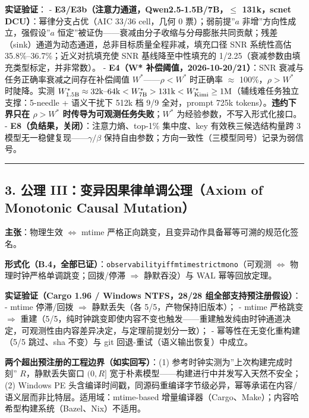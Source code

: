 \documentclass[
]{ctexart}
\renewcommand{\_}{\discretionary{}{}{\textunderscore}}
\renewcommand{\text}[1]{\textnormal{#1}}
\begin{document}
\textbf{实证验证}： -
\textbf{E3/E3b（注意力通道，Qwen2.5-1.5B/7B，\(\le\) 131k，scnet
DCU）}：幂律分支占优（AIC 33/36 cell，几何 0 票）；弱前提''\(a\)
非增''方向性成立，强假设''\(a\)
恒定''被证伪------衰减由分子收缩与分母膨胀共同贡献；残差（sink）通道为动态通道，总非目标质量全程非减，填充口径
SNR 系统性高估 35.8\%--36.7\%；近义对抗填充使 SNR 基线降至中性填充的
1/2.25（衰减参数由填充类型标定，并非常数）。 - \textbf{E4（W*
补偿阈值，2026-10-20/21）}：SNR 衰减与任务正确率衰减之间存在补偿阈值
\(W^*\)------\(\rho < W^*\) 时正确率 \(\approx\) 100\%，\(\rho > W^*\)
时陡降。实测
\(W^*_{1.5\text{B}} \approx 32\text{k–64k} < W^*_{7\text{B}} > 131\text{k} < W^*_{\text{Kimi}} \ge 1\text{M}\)（辅线难任务独立支撑：5-needle
+ 语义干扰下 512k 档 9/9 全对，prompt 725k
tokens）。\textbf{违约下界只在 \(\rho > W^*\)
时传导为可观测任务失败}；\(W^*\) 为经验参数，不写入形式化接口。 -
\textbf{E8（负结果，关闭）}：注意力熵、top-1\% 集中度、key
有效秩三候选结构量跨 3 模型无一稳健复现------\(\gamma/\beta\)
保持自由参数；方向一致性（三模型同号）记录为弱信号。

\begin{center}\rule{0.5\linewidth}{0.5pt}\end{center}

\subsection{3. 公理 III：变异因果律单调公理（Axiom of Monotonic Causal
Mutation）}\label{ux516cux7406-iiiux53d8ux5f02ux56e0ux679cux5f8bux5355ux8c03ux516cux7406axiom-of-monotonic-causal-mutation-1}

\textbf{主张}：物理生效 \(\Leftrightarrow\) mtime
严格正向跳变，且变异动作具备幂等可溯的规范化签名。

\textbf{形式化（B.4，全部已证）}：\texttt{observability\_iff\_mtime\_strict\_mono}（可观测
\(\Leftrightarrow\) 物理时钟严格单调跳变；回拨/停滞 \(\Rightarrow\)
静默吞没）与 WAL 幂等回放定理。

\textbf{实证验证（Cargo 1.96 / Windows NTFS，28/28
组全部支持预注册假设）}： - mtime 停滞/回拨 \(\Rightarrow\) 静默丢失（各
5/5，产物保持旧版本）； - mtime 严格跳变 \(\Rightarrow\)
重建（5/5，纯时钟跳变即使内容不变也触发------重建触发纯由时钟通道决定，可观测性由内容差异决定，与定理前提划分一致）；
- 幂等性在无变化重构建（5/5 跳过、sha 不变）与 git
回退-重试（语义输出恢复）中成立。

\textbf{两个超出预注册的工程边界（如实回写）}：(1)
参考时钟实测为''上次构建完成时刻'' \(R\)，静默丢失窗口 \((0,R]\)
宽于朴素模型------构建进行中并发写入天然不安全；(2) Windows PE
头含编译时间戳，同源码重编译字节级必异，幂等承诺在内容/语义层而非比特层。适用域：mtime-based
增量编译器（Cargo、Make）；内容哈希型构建系统（Bazel、Nix）不适用。
\end{document}
